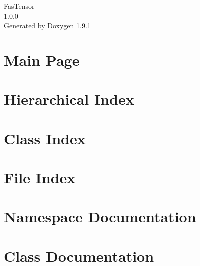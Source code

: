 \let\mypdfximage\pdfximage\def\pdfximage{\immediate\mypdfximage}\documentclass[twoside]{book}
\newcommand{\+}{\discretionary{\mbox{\scriptsize$\hookleftarrow$}}{}{}}
\newcommand{\clearemptydoublepage}{%
  \newpage{\pagestyle{empty}\cleardoublepage}%
}
\begin{document}
\raggedbottom

\hypersetup{pageanchor=false,
             bookmarksnumbered=true,
             pdfencoding=unicode
            }
\begin{titlepage}
\vspace*{7cm}
\begin{center}%
{\Large Fas\+Tensor \\[1ex]\large 1.\+0.\+0 }\\
\vspace*{1cm}
{\large Generated by Doxygen 1.9.1}\\
\end{center}
\end{titlepage}
\clearemptydoublepage
{}
\tableofcontents
\clearemptydoublepage
{}
\hypersetup{pageanchor=true}

\chapter{Main Page}
\label{index}\hypertarget{index}{}
\chapter{Hierarchical Index}

\chapter{Class Index}

\chapter{File Index}

\chapter{Namespace Documentation}

\chapter{Class Documentation}






















\end{document}
